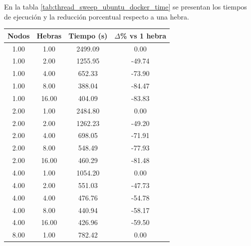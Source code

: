En la tabla \ref{tab:thread_sweep_ubuntu_docker_time} se presentan los tiempos de ejecución y la reducción porcentual respecto a una hebra.

\begin{table}[ht]
    \centering
    \begin{tabular}{|c|c|c|c|}
        \hline
        \textbf{Nodos} & \textbf{Hebras} & \textbf{Tiempo (s)} & \textbf{$\Delta$\% vs 1 hebra} \\
        \hline
        1.00           & 1.00            & 2499.09             & 0.00                           \\
        1.00           & 2.00            & 1255.95             & -49.74                         \\
        1.00           & 4.00            & 652.33              & -73.90                         \\
        1.00           & 8.00            & 388.04              & -84.47                         \\
        1.00           & 16.00           & 404.09              & -83.83                         \\
        2.00           & 1.00            & 2484.80             & 0.00                           \\
        2.00           & 2.00            & 1262.23             & -49.20                         \\
        2.00           & 4.00            & 698.05              & -71.91                         \\
        2.00           & 8.00            & 548.49              & -77.93                         \\
        2.00           & 16.00           & 460.29              & -81.48                         \\
        4.00           & 1.00            & 1054.20             & 0.00                           \\
        4.00           & 2.00            & 551.03              & -47.73                         \\
        4.00           & 4.00            & 476.76              & -54.78                         \\
        4.00           & 8.00            & 440.94              & -58.17                         \\
        4.00           & 16.00           & 426.96              & -59.50                         \\
        8.00           & 1.00            & 782.42              & 0.00                           \\

\end{tabular}
\end{table}
